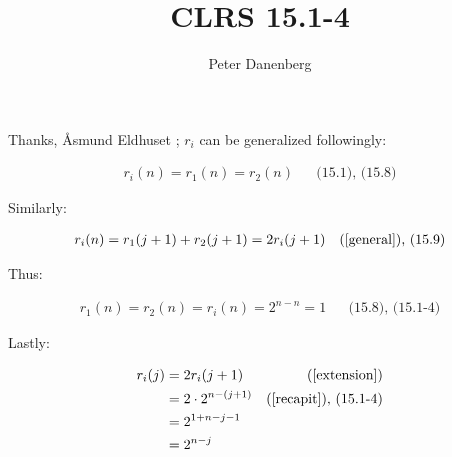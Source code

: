 \documentclass{article}
\title{CLRS 15.1-4}
\author{Peter Danenberg}
\begin{document}
\maketitle
Thanks, \r{A}smund Eldhuset \cite{eldhuset:07}; $r_i$ can be
generalized followingly:

\begin{align}
  r_i(n) = r_1(n) = r_2(n) && \text{(15.1), (15.8)}\label{general}
\end{align}

Similarly:

\begin{align}
  r_i(n) = r_1(j+1)+r_2(j+1) = 2r_i(j+1) && \text{(\ref{general}),
    (15.9)}\label{extension}
\end{align}

Thus:

\begin{align}
  r_1(n) = r_2(n) = r_i(n) = 2^{n-n} = 1 && \text{(15.8), (15.1-4)}
\end{align}

Lastly:

\begin{align}
  r_i(j) &= 2r_i(j+1) & \text{(\ref{extension})}\label{recapit} \\
  &= 2\cdot 2^{n-(j+1)} & \text{(\ref{recapit}), (15.1-4)} \\
  &= 2^{1+n-j-1} \\
  &= 2^{n-j} \\
\end{align}


\end{document}
